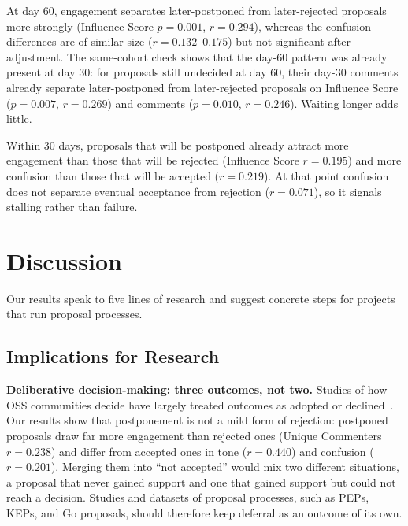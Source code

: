 \documentclass[conference]{IEEEtran}
\begin{document}
At day 60, engagement separates later-postponed from later-rejected proposals more strongly (Influence Score $p = 0.001$, $r = 0.294$), whereas the confusion differences are of similar size ($r = 0.132$--$0.175$) but not significant after adjustment. The same-cohort check shows that the day-60 pattern was already present at day 30: for proposals still undecided at day 60, their day-30 comments already separate later-postponed from later-rejected proposals on Influence Score ($p = 0.007$, $r = 0.269$) and comments ($p = 0.010$, $r = 0.246$). Waiting longer adds little.

\begin{tcolorbox}[
  colback=heatmaplight,
  colframe=heatmapdark,
  coltitle=white,
  fonttitle=\bfseries,
  title=Summary --- RQ2
]
Within 30 days, proposals that will be postponed already attract more engagement than those that will be rejected (Influence Score $r = 0.195$) and more confusion than those that will be accepted ($r = 0.219$). At that point confusion does not separate eventual acceptance from rejection ($r = 0.071$), so it signals stalling rather than failure.
\end{tcolorbox}

\section{Discussion}
Our results speak to five lines of research and suggest concrete steps for projects that run proposal processes.

\subsection{Implications for Research}
\textbf{Deliberative decision-making: three outcomes, not two.} Studies of how OSS communities decide have largely treated outcomes as adopted or declined~\cite{9402135, https://doi.org/10.1002/spe.3128, kondo2025empirical}. Our results show that postponement is not a mild form of rejection: postponed proposals draw far more engagement than rejected ones (Unique Commenters $r = 0.238$) and differ from accepted ones in tone ($r = 0.440$) and confusion ($r = 0.201$). Merging them into ``not accepted'' would mix two different situations, a proposal that never gained support and one that gained support but could not reach a decision. Studies and datasets of proposal processes, such as PEPs, KEPs, and Go proposals, should therefore keep deferral as an outcome of its own.
\end{document}
